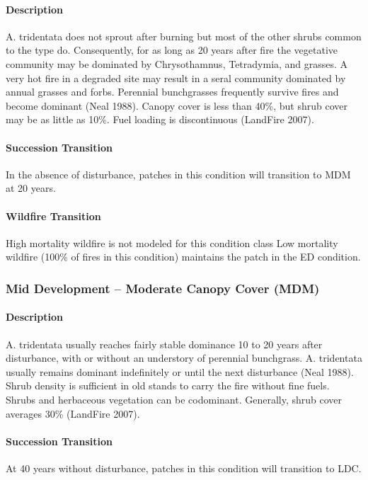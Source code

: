 \paragraph{Description} A. tridentata does not sprout after burning but most of the other shrubs common to the type do. Consequently, for as long as 20 years after fire the vegetative community may be dominated by Chrysothamnus, Tetradymia, and grasses. A very hot fire in a degraded site may result in a seral community dominated by annual grasses and forbs. Perennial bunchgrasses frequently survive fires and become dominant (Neal 1988). Canopy cover is less than 40\%, but shrub cover may be as little as 10\%. Fuel loading is discontinuous (LandFire 2007).

\paragraph{Succession Transition} In the absence of disturbance, patches in this condition will transition to MDM at 20 years. 

\paragraph{Wildfire Transition} High mortality wildfire is not modeled for this condition class Low mortality wildfire (100\% of fires in this condition) maintains the patch in the ED condition. 

\noindent\hrulefill


\subsubsection{Mid Development – Moderate Canopy Cover (MDM)}

\paragraph{Description} A. tridentata usually reaches fairly stable dominance 10 to 20 years after disturbance, with or without an understory of perennial bunchgrass. A. tridentata usually remains dominant indefinitely or until the next disturbance (Neal 1988). Shrub density is sufficient in old stands to carry the fire without fine fuels. Shrubs and herbaceous vegetation can be codominant. Generally, shrub cover averages 30\% (LandFire 2007).

\paragraph{Succession Transition} At 40 years without disturbance, patches in this condition will transition to LDC. 

